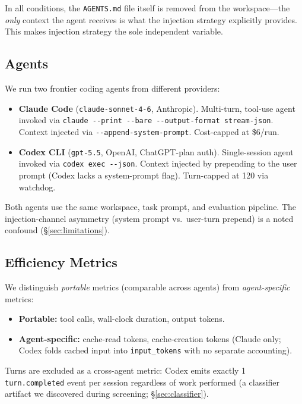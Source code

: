 \documentclass[11pt]{article}
\newcommand{\agentsmd}{\texttt{AGENTS.md}}
\begin{document}
In all conditions, the \agentsmd{} file itself is removed from the workspace---the \emph{only} context the agent receives is what the injection strategy explicitly provides.
This makes injection strategy the sole independent variable.

\subsection{Agents}

We run two frontier coding agents from different providers:
\begin{itemize}
    \item \textbf{Claude Code} (\texttt{claude-sonnet-4-6}, Anthropic). Multi-turn, tool-use agent invoked via \texttt{claude -{}-print -{}-bare -{}-output-format stream-json}. Context injected via \texttt{-{}-append-system-prompt}. Cost-capped at \$6/run.
    \item \textbf{Codex CLI} (\texttt{gpt-5.5}, OpenAI, ChatGPT-plan auth). Single-session agent invoked via \texttt{codex exec -{}-json}. Context injected by prepending to the user prompt (Codex lacks a system-prompt flag). Turn-capped at 120 via watchdog.
\end{itemize}

Both agents use the same workspace, task prompt, and evaluation pipeline.
The injection-channel asymmetry (system prompt vs.\ user-turn prepend) is a noted confound (\S\ref{sec:limitations}).

\subsection{Efficiency Metrics}

We distinguish \emph{portable} metrics (comparable across agents) from \emph{agent-specific} metrics:
\begin{itemize}
    \item \textbf{Portable:} tool calls, wall-clock duration, output tokens.
    \item \textbf{Agent-specific:} cache-read tokens, cache-creation tokens (Claude only; Codex folds cached input into \texttt{input\_tokens} with no separate accounting).
\end{itemize}

Turns are excluded as a cross-agent metric: Codex emits exactly 1 \texttt{turn.completed} event per session regardless of work performed (a classifier artifact we discovered during screening; \S\ref{sec:classifier}).
\end{document}
